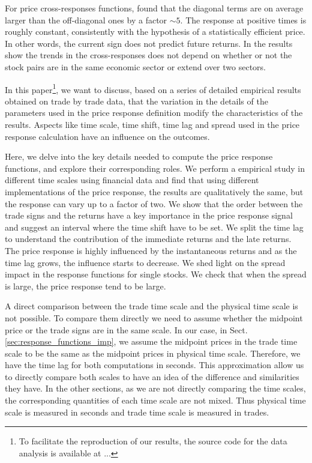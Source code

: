 For price cross-responses functions, \cite{dissecting_cross} found that the
diagonal terms are on average larger than the off-diagonal ones by a factor
$\sim 5$. The response at positive times is roughly constant, consistently with
the hypothesis of a statistically efficient price. In other words, the current
sign does not predict future returns. In \cite{Wang_2016_cross} the results
show the trends in the cross-responses does not depend on whether or not the
stock pairs are in the same economic sector or extend over two sectors.

In this paper\footnote{To facilitate the reproduction of our results, the
source code for the data analysis is available at ...}, we want to discuss,
based on a series of detailed empirical results obtained on trade by trade
data, that the variation in the details of the parameters used in the price
response definition modify the characteristics of the results. Aspects like
time scale, time shift, time lag and spread used in the price response
calculation have an influence on the outcomes.

Here, we delve into the key details needed to compute the price response
functions, and explore their corresponding roles. We perform a empirical
study in different time scales using financial data and find that using
different implementations of the price response, the results are qualitatively
the same, but the response can vary up to a factor of two. We show that the
order between the trade signs and the returns have a key importance in the
price response signal and suggest an interval where the time shift have to be
set. We split the time lag to understand the contribution of the immediate
returns and the late returns. The price response is highly influenced by the
instantaneous returns and as the time lag grows, the influence starts to
decrease. We shed light on the spread impact in the response functions for
single stocks. We check that when the spread is large, the price response tend
to be large.

A direct comparison between the trade time scale and the physical time scale is
not possible. To compare them directly we need to assume whether the midpoint
price or the trade signs are in the same scale. In our case, in Sect.
\ref{sec:response_functions_imp}, we assume the midpoint prices in the trade
time scale to be the same as the midpoint prices in physical time scale.
Therefore, we have the time lag for both computations in seconds. This
approximation allow us to directly compare both scales to have an idea of the
difference and similarities they have. In the other sections, as we are not
directly comparing the time scales, the corresponding quantities of each time
scale are not mixed. Thus physical time scale is measured in seconds and trade
time scale is measured in trades.

